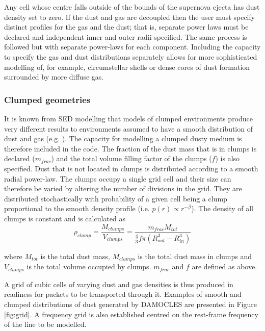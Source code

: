 Any cell whose centre falls outside of the bounds of the supernova ejecta has dust density set to zero.  If the dust and gas are decoupled then the user must specify distinct profiles for the gas and the dust; that is, separate power laws must be declared and independent inner and outer radii specified.  The same process is followed but with separate power-laws for each component.  Including the capacity to specify the gas and dust distributions separately allows for more sophisticated modelling of, for example, circumstellar shells or dense cores of dust formation surrounded by more diffuse gas.

\subsubsection{Clumped geometries}

It is known from SED modelling that models of clumped environments produce very different results to environments assumed to have a smooth distribution of dust and gas (e.g. \citet{Bianchi2000,Ercolano2007,Owen2015}).  %
The capacity for modelling a clumped dusty medium is therefore included in the code.  The fraction of the dust mass that is in clumps is declared ($m_{frac}$) and the total volume filling factor of the clumps ($f$) is also specified.  Dust that is not located in clumps is distributed according to a smooth radial power-law.  The clumps occupy  a single grid cell and their size can therefore be varied by altering the number of divisions in the grid.  They are distributed stochastically with probability of a given cell being a clump proportional to the smooth density profile (i.e. $p(r) \propto r^{-\beta}$).  The density of all clumps is constant and is calculated as 
\begin{equation}
\rho_{clump}=\frac{M_{clumps}}{V_{clumps}}=\frac{m_{frac}M_{tot}}{\frac{4}{3} f\pi (R_{out}^{3}-R_{in}^{3} )}
\end{equation}

\noindent where $M_{tot}$ is the total dust mass, $M_{clumps}$ is the total dust mass in clumps and $V_{clumps}$ is the total volume occupied by clumps.  $m_{frac}$ and $f$ are defined as above.

A grid of cubic cells of varying dust and gas densities is thus produced in readiness for packets to be transported through it.  Examples of smooth and clumped distributions of dust generated by DAMOCLES are presented in Figure \ref{fig:grid}.  A frequency grid is also established centred on the rest-frame frequency of the line to be modelled.



